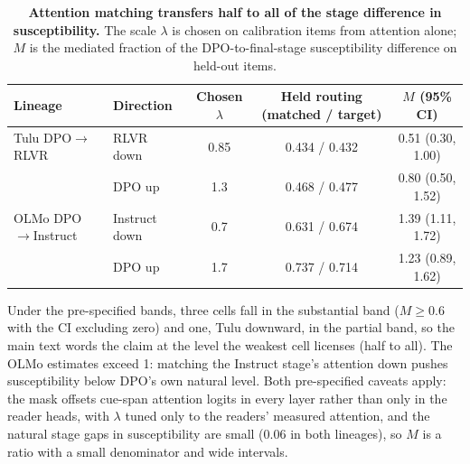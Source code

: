 \documentclass{article}
\begin{document}
\begin{table}[h]
\centering
\small
\setlength{\tabcolsep}{4.5pt}
\begin{tabular}{llccc}
\toprule
Lineage & Direction & Chosen $\lambda$ & Held routing (matched / target) & $M$ (95\% CI) \\
\midrule
Tulu DPO$\to$RLVR & RLVR down & 0.85 & 0.434 / 0.432 & 0.51 (0.30, 1.00) \\
 & DPO up & 1.3 & 0.468 / 0.477 & 0.80 (0.50, 1.52) \\
OLMo DPO$\to$Instruct & Instruct down & 0.7 & 0.631 / 0.674 & 1.39 (1.11, 1.72) \\
 & DPO up & 1.7 & 0.737 / 0.714 & 1.23 (0.89, 1.62) \\
\bottomrule
\end{tabular}
\caption{\textbf{Attention matching transfers half to all of the stage difference in susceptibility.} The scale $\lambda$ is chosen on calibration items from attention alone; $M$ is the mediated fraction of the DPO-to-final-stage susceptibility difference on held-out items.}
\label{tab:gainmatch}
\end{table}

Under the pre-specified bands, three cells fall in the substantial band ($M \ge 0.6$ with the CI excluding zero) and one, Tulu downward, in the partial band, so the main text words the claim at the level the weakest cell licenses (half to all). The OLMo estimates exceed 1: matching the Instruct stage's attention down pushes susceptibility below DPO's own natural level. Both pre-specified caveats apply: the mask offsets cue-span attention logits in every layer rather than only in the reader heads, with $\lambda$ tuned only to the readers' measured attention, and the natural stage gaps in susceptibility are small ($0.06$ in both lineages), so $M$ is a ratio with a small denominator and wide intervals.
\end{document}
